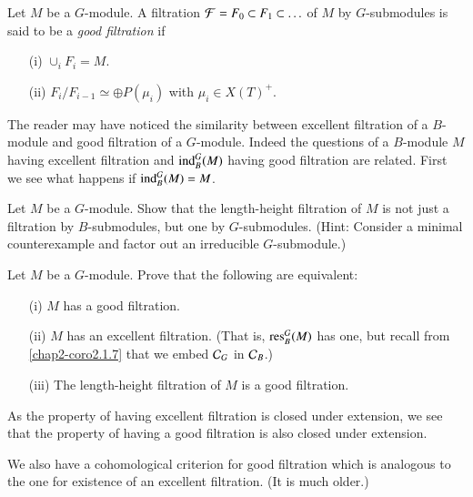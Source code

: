 \begin{definition}\label{chap4-defi4.1.1}
Let $M$ be a $G$-module. A filtration $\mathcal{F}=F_{0}\subset F_{1}\subset
\ldots$ of $M$ by $G$-submodules is said to be a 
{\em good filtration} if
\begin{itemize}
\item[(i)] $\cup_{i}F_{i}=M$.

\item[(ii)] $F_{i}/F_{i-1}\simeq \oplus P(\mu_{i})$ with $\mu_{i}\in
  X(T)^{+}$. 
\end{itemize}
\end{definition}

The reader may have noticed the similarity between excellent
filtration of a $B$-module and good filtration of a $G$-module. Indeed
the questions of a $B$-module $M$ having excellent filtration and
$\operatorname{ind}^{G}_{B}(M)$ having good filtration are related. First we see
what happens if $\operatorname{ind}^{G}_{B}(M)=M$.

\begin{exercise}\label{chap4-exer4.1.2}
Let $M$ be a $G$-module. Show that the length-height filtration of $M$
is not just a filtration by $B$-submodules, but one by
$G$-submodules. (Hint: Consider a minimal counterexample and factor
out an irreducible $G$-submodule.)
\end{exercise}

\begin{exercise}\label{chap4-exer4.1.3}
Let $M$ be a $G$-module. Prove that the following are equivalent:
\begin{itemize}
\item[(i)] $M$ has a good filtration.

\item[(ii)] $M$ has an excellent filtration. (That is,
  $\operatorname{res}^{G}_{B}(M)$ has one, but recall from \ref{chap2-coro2.1.7}
  that we embed $\mathcal{C}_{G}$ in $\mathcal{C}_{B}$.)

\item[(iii)] The length-height filtration of $M$ is a good filtration.
\end{itemize}
\end{exercise}

\begin{remark}\label{chap4-rem4.1.4}
As the property of having excellent filtration is closed under
extension, we see that the property of having a good filtration is
also closed under extension.
\end{remark}

We also have a cohomological criterion for good filtration which is
analogous to the one for existence of an excellent filtration. (It is
much older.) 

